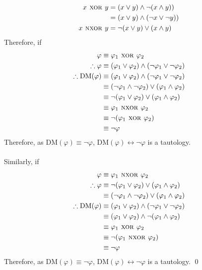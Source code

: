 \documentclass[fleqn, a4paper, 12pt, oneside]{amsart}
\theoremstyle{definition}
\theoremstyle{theorem}
\theoremstyle{remark}
\newcommand{\Xor}{{\textsc{ xor }}}
\newcommand{\Nxor}{{\textsc{ nxor }}}
\newcommand{\AND}{\wedge}
\newcommand{\OR}{\vee}
\newcommand{\NOT}{\neg}
\newcommand{\logequiv}{\leftrightarrow}
\begin{document}
\begin{solution}
	\begin{align*}
		x \Xor y &= (x \OR y) \AND \NOT(x \AND y))\\
		         &= (x \OR y) \AND (\NOT x \OR \NOT y))\\
		x \Nxor y &= \NOT (x \OR y) \OR (x \AND y)
	\end{align*}
	Therefore, if
	\begin{align*}
		\varphi &\equiv \varphi_1 \Xor \varphi_2\\
		\therefore \varphi &\equiv (\varphi_1 \OR \varphi_2) \AND (\NOT \varphi_1 \OR \NOT \varphi_2)\\
		\therefore \mathrm{DM}(\varphi) &\equiv (\varphi_1 \OR \varphi_2) \AND (\NOT \varphi_1 \OR \NOT \varphi_2)\\
		&\equiv (\NOT \varphi_1 \AND \NOT \varphi_2) \OR (\varphi_1 \AND \varphi_2)\\
		&\equiv \NOT (\varphi_1 \OR \varphi_2) \OR (\varphi_1 \AND \varphi_2)\\
		&\equiv \varphi_1 \Nxor \varphi_2\\
		&\equiv \NOT (\varphi_1 \Xor \varphi_2)\\
		&\equiv \NOT \varphi
	\end{align*}
	Therefore, as $\mathrm{DM}(\varphi) \equiv \NOT \varphi$, $\mathrm{DM}(\varphi) \logequiv \NOT \varphi$ is a tautology.\\
	~\\
	Similarly, if
	\begin{align*}
		\varphi &\equiv \varphi_1 \Nxor \varphi_2\\
		\therefore \varphi &\equiv \NOT (\varphi_1 \OR \varphi_2) \OR (\varphi_1 \AND \varphi_2)\\
		&\equiv (\NOT \varphi_1 \AND \NOT \varphi_2) \OR (\varphi_1 \AND \varphi_2)\\
		\therefore \mathrm{DM}(\varphi) &\equiv (\varphi_1 \OR \varphi_2) \AND (\NOT \varphi_1 \OR \NOT \varphi_2)\\
		&\equiv (\varphi_1 \OR \varphi_2) \AND \NOT (\varphi_1 \AND \varphi_2)\\
		&\equiv \varphi_1 \Xor \varphi_2\\
		&\equiv \NOT (\varphi_1 \Nxor \varphi_2)\\
		&\equiv \NOT \varphi
	\end{align*}
	Therefore, as $\mathrm{DM}(\varphi) \equiv \NOT \varphi$, $\mathrm{DM}(\varphi) \logequiv \NOT \varphi$ is a tautology.
	\qed
\end{solution}
\end{document}
